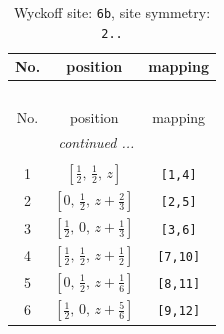\documentclass[fleqn,8pt]{jsarticle}
\begin{document}
\begin{longtable}{ccc}
\caption{Wyckoff site: {\tt 6b}, site symmetry: {\tt 2..}}
 \\
 \hline \hline
No. & position & mapping \\ \hline \endfirsthead

\multicolumn{2}{l}{\tablename\ \thetable{}} \\
 \hline \hline
No. & position & mapping \\ \hline \endhead

 \hline \hline
\multicolumn{2}{r}{\footnotesize\it continued ...} \\ \endfoot

 \hline \hline
\multicolumn{2}{r}{} \\ \endlastfoot

1 & $\left[ \frac{1}{2},\, \frac{1}{2},\, z \right]$ & {\tt [1,4]} \\ \hline
2 & $\left[ 0,\, \frac{1}{2},\, z + \frac{2}{3} \right]$ & {\tt [2,5]} \\ \hline
3 & $\left[ \frac{1}{2},\, 0,\, z + \frac{1}{3} \right]$ & {\tt [3,6]} \\ \hline
4 & $\left[ \frac{1}{2},\, \frac{1}{2},\, z + \frac{1}{2} \right]$ & {\tt [7,10]} \\ \hline
5 & $\left[ 0,\, \frac{1}{2},\, z + \frac{1}{6} \right]$ & {\tt [8,11]} \\ \hline
6 & $\left[ \frac{1}{2},\, 0,\, z + \frac{5}{6} \right]$ & {\tt [9,12]} \\
\end{longtable}
\renewcommand{\arraystretch}{1.2}
\end{document}
